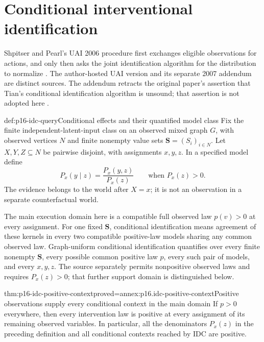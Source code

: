 \section{Conditional interventional identification}
\label{sec:p16-conditional-interventional-identification}

Shpitser and Pearl's UAI 2006 procedure first exchanges eligible
observations for actions, and only then asks the joint identification
algorithm for the distribution to normalize
\cite[Section~5, Figure~3 and Appendix]{ShpitserPearl2006ConditionalIdentification}.
The author-hosted UAI version and its separate 2007 addendum are distinct
sources. The addendum retracts the original paper's assertion that Tian's
conditional identification algorithm is unsound; that assertion is not
adopted here \cite{Shpitser2007ConditionalIdentificationAppendum}.

\begin{hbdefinition}{def:p16-idc-query}{Conditional effects and their quantified model class}
Fix the finite independent-latent-input class on an observed mixed graph
\(G\), with observed vertices \(N\) and finite nonempty value sets
\(\mathbf S=(S_i)_{i\in N}\). Let \(X,Y,Z\subseteq N\)
be pairwise disjoint, with assignments \(x,y,z\). In a specified
model define
\[
 P_x(y\mid z)=\frac{P_x(y,z)}{P_x(z)}
 \qquad\text{when }P_x(z)>0.
\]
The evidence belongs to the world after \(X=x\); it is not
an observation in a separate counterfactual world.

The main execution domain here is a compatible full observed law
\(p(v)>0\) at every assignment. For one fixed \(\mathbf S\),
conditional identification means agreement of these kernels in every
two compatible positive-law models sharing any common observed law.
Graph-uniform conditional identification quantifies over every finite
nonempty \(\mathbf S\), every possible common positive law \(p\),
every such pair of models, and every \(x,y,z\).
The source separately permits nonpositive observed laws and requires
\(P_x(z)>0\); that further support domain is distinguished below.
\end{hbdefinition}

\begin{hblemma}{thm:p16-idc-positive-context}{proved=annex:p16.idc-positive-context}{Positive observations supply every conditional context in the main domain}
If \(p>0\) everywhere, then every intervention law is positive
at every assignment of its remaining observed variables. In particular,
all the denominators \(P_x(z)\) in the preceding definition and
all conditional contexts reached by IDC are positive.
\end{hblemma}

